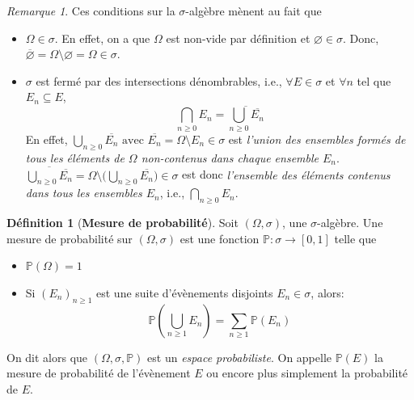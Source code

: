 \documentclass[12pt,a4paper]{report}
\theoremstyle{definition}%
\newtheorem{definition}{Définition}[chapter]
\theoremstyle{remark}
\newtheorem{remark}{Remarque}[chapter]
\newcommand{\ie}{i.e., }
\let\labelitemi\labelitemii
\begin{document}
\begin{remark} \label{probaremark}
	Ces conditions sur la $\sigma$-algèbre mènent au fait que
	\begin{itemize}
		\renewcommand{\labelitemi}{\tiny$\bullet$}
		\item
	$\Omega \in \sigma$. En effet, on a que $\Omega$ est non-vide par définition et $\varnothing \in \sigma$. Donc, $\overline{\varnothing} = \Omega \setminus \varnothing = \Omega \in \sigma$.
		\item 	$\sigma$ est fermé par des intersections dénombrables, \ie $\forall E \in \sigma$ et $\forall n$ tel que $E_n \subseteq E$,
		\[ \bigcap_{n \geq 0} E_n = \overline{\bigcup_{n \geq 0} \overline{E_n}}\]
		En effet, $\bigcup_{n \geq 0} \overline{E_n} \text{ avec } \overline{E_n}  = \Omega \setminus E_n \in \sigma$ est \textit{l'union des ensembles formés de tous les éléments de $\Omega$ non-contenus dans chaque ensemble $E_n$}. \\
		$\overline{\bigcup_{n \geq 0} \overline{E_n}} = \Omega \setminus \big(\bigcup_{n \geq 0} \overline{E_n} \big) \in \sigma$ est donc \textit{l'ensemble des éléments contenus dans tous les ensembles $E_n$}, \ie $\bigcap_{n \geq 0} E_n$.
	\end{itemize}
\end{remark}

\begin{definition}[\textbf{Mesure de probabilité}]\label{proba_measure} Soit $(\Omega, \sigma)$, une $\sigma$-algèbre.
	Une mesure de probabilité sur $(\Omega, \sigma)$ est une fonction $\mathbb{P} : \sigma \rightarrow [0, 1]$ telle que
	\begin{itemize}
		\renewcommand{\labelitemi}{\tiny$\bullet$}
		\item $\mathbb{P}(\Omega) = 1$
		\item Si $(E_n)_{n \geq 1}$ est une suite d'évènements disjoints $E_n \in \sigma$, alors:
		\[\mathbb{P}(\bigcup_{n \geq 1} E_n) = \sum_{n \geq 1} \mathbb{P}(E_n)\]
	\end{itemize}
	On dit alors que $(\Omega, \sigma, \mathbb{P})$ est un \textit{espace probabiliste}.
	On appelle $\mathbb{P}(E)$ la mesure de probabilité de l'évènement $E$ ou encore plus simplement la probabilité de $E$.
\end{definition}
\end{document}
